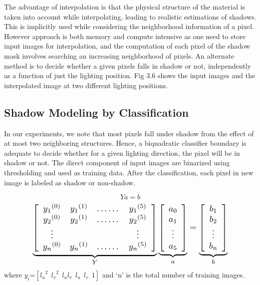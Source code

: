 The advantage of interpolation is that the physical structure of the material is
taken into account while interpolating, leading to realistic estimations of
shadows. This is implicitly used while considering the neighborhood information
of a pixel. However approach is both memory and compute intensive as one need to
store input images for interpolation, and the computation of each
pixel of the shadow mask involves searching an increasing neighborhood of
pixels. An alternate method is to decide whether a given pixels falls in shadow
or not, independently as a function of just the lighting position. Fig 3.6 shows 
the input images and the interpolated image at two different lighting positions.


\subsection{Shadow Modeling by Classification}

In our experiments, we note that most pixels fall under shadow from the effect
of at most two neighboring structures. Hence, a biquadratic classifier boundary
is adequate to decide whether for a given lighting direction, the pixel will be
in shadow or not. The direct component of input images are binarized using
thresholding and used as training data. After the classification, each pixel in
new image is labeled as shadow or non-shadow.

\begin{equation}
 Ya=b
\end{equation}
\begin{equation}
\resizebox{.81\hsize}{!}{$
\underbrace{\left[ {\begin{array}{cccccc}
 {y_1}^{(0)} & {y_1}^{(1)} & \dots\dots & {y_1}^{(5)}\\
{y_2}^{(0)} & {y_2}^{(1)} & \dots\dots & {y_2}^{(5)} \\
 \vdots &  &  & \vdots \\
{y_n}^{(0)} & {y_n}^{(1)} & \dots\dots & {y_n}^{(5)}
 \end{array} } \right]}_{Y}
\underbrace{\left[ {\begin{array}{c}
a_0\\a_1\\ \vdots \\a_5
 \end{array} } \right]}_{a}
=
\underbrace{\left[ {\begin{array}{c}
b_1\\b_2\\ \vdots \\b_n
 \end{array} } \right]}_{b}$}
\end{equation}where
$y_i$=$[{l_u}^2\ \ {l_v}^2\ \ l_ul_v\ \ l_u\ \ l_v\ \ 1]$ and `n' is the total
number of training images.



